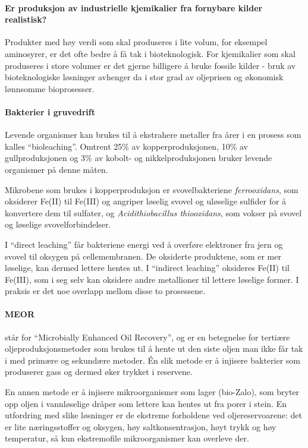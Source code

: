 \paragraph{Er produksjon av industrielle kjemikalier fra fornybare kilder realistisk?} Produkter med høy verdi som skal produseres i lite volum, for eksempel aminosyrer, er det ofte bedre å få tak i bioteknologisk. For kjemikalier som skal produseres i store volumer er det gjerne billigere å bruke fossile kilder - bruk av bioteknologiske løsninger avhenger da i stor grad av oljeprisen og økonomisk lønnsomme bioprosesser. 

\paragraph{Bakterier i gruvedrift} Levende organismer kan brukes til å ekstrahere metaller fra årer i en prosess som kalles ``bioleaching''. Omtrent 25\% av kopperproduksjonen, 10\% av gullproduksjonen og 3\% av kobolt- og nikkelproduksjonen bruker levende organismer på denne måten.

Mikrobene som brukes i kopperproduksjon er svovelbakteriene  \emph{ferrooxidans}, som oksiderer Fe(II) til Fe(III) og angriper løselig svovel og uløselige sulfider for å konvertere dem til sulfater, og \emph{Acidithiobacillus thiooxidans}, som vokser på svovel og løselige svovelforbindelser.

I ``direct leaching'' får bakteriene energi ved å overføre elektroner fra jern og svovel til oksygen på cellemembranen. De oksiderte produktene, som er mer løselige, kan dermed lettere hentes ut. I ``indirect leaching'' oksideres Fe(II) til Fe(III), som i seg selv kan oksidere andre metallioner til lettere løselige former. I praksis er det noe overlapp mellom disse to prosessene.

\paragraph{MEOR} står for ``Microbially Enhanced Oil Recovery'', og er en betegnelse for tertiære oljeproduksjonsmetoder som brukes til å hente ut den siste oljen man ikke får tak i med primære og sekundære metoder. Én slik metode er å injisere bakterier som produserer gass og dermed øker trykket i reservene. 

En annen metode er å injisere mikroorganismer som lager  (bio-Zalo), som bryter opp oljen i vannløselige dråper som lettere kan hentes ut fra porer i stein. En utfordring med slike løsninger er de ekstreme forholdene ved oljereservoarene: det er lite næringsstoffer og oksygen, høy saltkonsentrasjon, høyt trykk og høy temperatur, så kun ekstremofile mikroorganismer kan overleve der.

